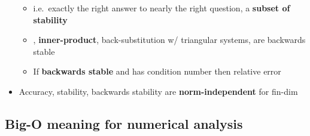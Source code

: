 \begin{itemize}
        \begin{itemize}

          \item
                i.e.~exactly the right answer to nearly the right question, a
                \textbf{subset of stability}
          \item
                \iMbox{\oplus, \ominus, \otimes, \oslash}, \textbf{inner-product},
                back-substitution w/ triangular systems, are backwards stable
          \item
                If \textbf{backwards stable}  and  has
                condition number  then relative error
        \end{itemize}
  \item
        Accuracy, stability, backwards stability are \textbf{norm-independent}
        for fin-dim 
\end{itemize}

\subsection*{Big-O meaning for numerical
  analysis}

